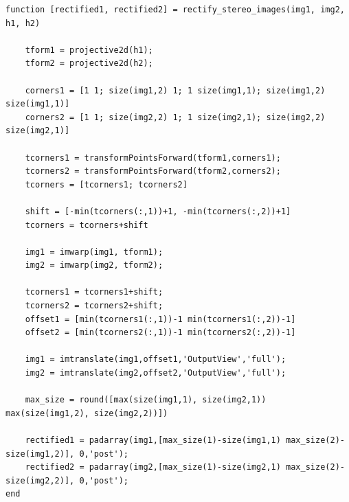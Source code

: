 \begin{lstlisting}[style=Matlab-editor]
function [rectified1, rectified2] = rectify_stereo_images(img1, img2, h1, h2)

    tform1 = projective2d(h1);
    tform2 = projective2d(h2);
    
    corners1 = [1 1; size(img1,2) 1; 1 size(img1,1); size(img1,2) size(img1,1)]
    corners2 = [1 1; size(img2,2) 1; 1 size(img2,1); size(img2,2) size(img2,1)]
    
    tcorners1 = transformPointsForward(tform1,corners1);
    tcorners2 = transformPointsForward(tform2,corners2);
    tcorners = [tcorners1; tcorners2]
    
    shift = [-min(tcorners(:,1))+1, -min(tcorners(:,2))+1]
    tcorners = tcorners+shift
    
    img1 = imwarp(img1, tform1);
    img2 = imwarp(img2, tform2);
    
    tcorners1 = tcorners1+shift;
    tcorners2 = tcorners2+shift;
    offset1 = [min(tcorners1(:,1))-1 min(tcorners1(:,2))-1]
    offset2 = [min(tcorners2(:,1))-1 min(tcorners2(:,2))-1]
    
    img1 = imtranslate(img1,offset1,'OutputView','full');
    img2 = imtranslate(img2,offset2,'OutputView','full');
    
    max_size = round([max(size(img1,1), size(img2,1)) max(size(img1,2), size(img2,2))])
    
    rectified1 = padarray(img1,[max_size(1)-size(img1,1) max_size(2)-size(img1,2)], 0,'post');
    rectified2 = padarray(img2,[max_size(1)-size(img2,1) max_size(2)-size(img2,2)], 0,'post');
end
\end{lstlisting}
